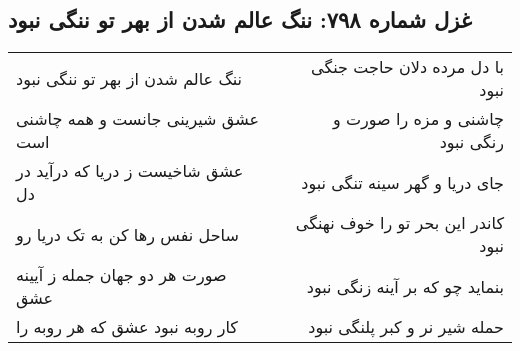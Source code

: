 \begin{center}
\section*{غزل شماره ۷۹۸: ننگ عالم شدن از بهر تو ننگی نبود}
\label{sec:0798}
\begin{longtable}{l p{0.5cm} r}
ننگ عالم شدن از بهر تو ننگی نبود
&&
با دل مرده دلان حاجت جنگی نبود
\\
عشق شیرینی جانست و همه چاشنی است
&&
چاشنی و مزه را صورت و رنگی نبود
\\
عشق شاخیست ز دریا که درآید در دل
&&
جای دریا و گهر سینه تنگی نبود
\\
ساحل نفس رها کن به تک دریا رو
&&
کاندر این بحر تو را خوف نهنگی نبود
\\
صورت هر دو جهان جمله ز آیینه عشق
&&
بنماید چو که بر آینه زنگی نبود
\\
کار روبه نبود عشق که هر روبه را
&&
حمله شیر نر و کبر پلنگی نبود
\\
\end{longtable}
\end{center}
